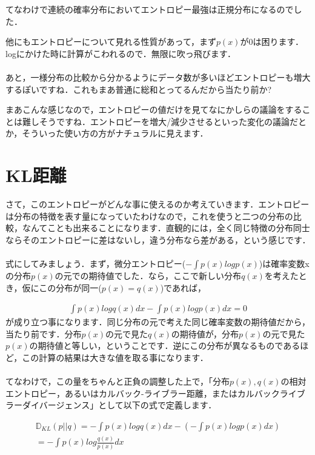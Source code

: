 \documentclass[11pt,a4paper,uplatex]{ujreport}
\begin{document}
てなわけで連続の確率分布においてエントロピー最強は正規分布になるのでした．

他にもエントロピーについて見れる性質があって，まず$p(x)$が0は困ります．logにかけた時に計算がこわれるので．無限に吹っ飛びます．\\
\\

あと，一様分布の比較から分かるようにデータ数が多いほどエントロピーも増大するぽいですね．これもまあ普通に総和とってるんだから当たり前か?

まあこんな感じなので，エントロピーの値だけを見てなにかしらの議論をすることは難しそうですね．エントロピーを増大/減少させるといった変化の議論だとか，そういった使い方の方がナチュラルに見えます．

\section{KL距離}
さて，このエントロピーがどんな事に使えるのか考えていきます．エントロピーは分布の特徴を表す量になっていたわけなので，これを使うと二つの分布の比較，なんてことも出来ることになります．直観的には，全く同じ特徴の分布同士ならそのエントロピーに差はないし，違う分布なら差がある，という感じです．\\
\\

式にしてみましょう．まず，微分エントロピー($- \int p(x) log p(x)$)は確率変数xの分布$p(x)$の元での期待値でした．なら，ここで新しい分布$q(x)$を考えたとき，仮にこの分布が同一($p(x) = q(x)$)であれば，

\begin{eqnarray}
\label{eq:KL1}
  \int p(x) log q(x)dx - \int p(x) log p(x)dx= 0
\end{eqnarray}
が成り立つ事になります．同じ分布の元で考えた同じ確率変数の期待値だから，当たり前です．分布$p(x)$の元で見た$q(x)$の期待値が，分布$p(x)$の元で見た$p(x)$の期待値と等しい，ということです．逆にこの分布が異なるものであるほど，この計算の結果は大きな値を取る事になります．\\
\\

てなわけで，この量をちゃんと正負の調整した上で，「分布$p(x), q(x)$の相対エントロピー，あるいはカルバック-ライブラー距離，またはカルバックライブラーダイバージェンス」として以下の式で定義します\cite{prml}．

\begin{eqnarray}
\label{eq:KLD}
  \mathbb{D}_{KL}(p||q) = - \int p(x) log q(x)dx - (-\int p(x) log p(x)dx)\\
  = -\int p(x) log \frac{q(x)}{p(x)} dx
\end{eqnarray}
\end{document}
